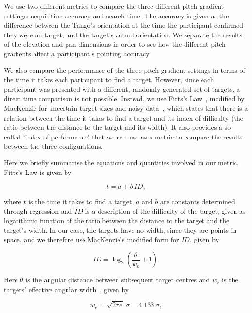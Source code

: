 \documentclass[acmsmall]{acmart}
\begin{document}
We use two different metrics to compare the three different pitch gradient settings: acquisition accuracy and search time.
The accuracy is given as the difference between the Tango's orientation at the time the participant confirmed they were on target, and the target's actual orientation.
We separate the results of the elevation and pan dimensions in order to see how the different pitch gradients affect a participant's pointing accuracy. 

We also compare the performance of the three pitch gradient settings in terms of the time it takes each participant to find a target.
However, since each participant was presented with a different, randomly generated set of targets, a direct time comparison is not possible.
Instead, we use Fitts's Law~\citep{fitts1954information}, modified by MacKenzie for uncertain target sizes and noisy data~\citep{mackenzie1992fitts}, which states that there is a relation between the time it takes to find a target and its index of difficulty (the ratio between the distance to the target and its width).
It also provides a so-called `index of performance' that we can use as a metric to compare the results between the three configurations. 

Here we briefly summarise the equations and quantities involved in our metric.
Fitts's Law is given by  

\begin{equation}
  \label{eq:fitts-base}
  t = a + b~ID,
\end{equation}

\noindent
where $t$ is the time it takes to find a target, $a$ and $b$ are constants determined through regression and $ID$ is a description of the difficulty of the target, given as logarithmic function of the ratio between the distance to the target and the target's width.
In our case, the targets have no width, since they are points in space, and we therefore use MacKenzie's modified form for $ID$, given by

\begin{equation}
  \label{eq:fitts-id}
  ID = \log_2\left(\frac{\theta}{w_e} + 1\right).
\end{equation}

\noindent
Here $\theta$ is the angular distance between subsequent target centres and $w_e$ is the targets' effective angular width~\citep{welford1968fundamentals}, given by

\begin{equation}
  \label{eq:fitts-we}
  w_e = \sqrt{2\pi e}~\sigma = 4.133~\sigma,
\end{equation}
\end{document}
